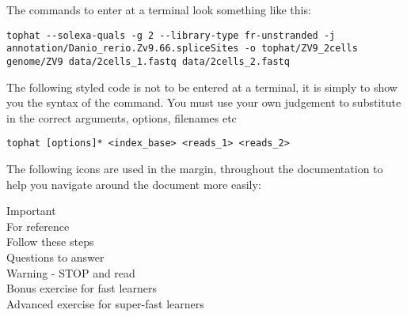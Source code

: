 The commands to enter at a terminal look something like this:
\begin{lstlisting}
tophat --solexa-quals -g 2 --library-type fr-unstranded -j annotation/Danio_rerio.Zv9.66.spliceSites -o tophat/ZV9_2cells genome/ZV9 data/2cells_1.fastq data/2cells_2.fastq
\end{lstlisting}

The following styled code is not to be entered at a terminal, it is simply to show you the syntax of
the command. You must use your own judgement to substitute in the correct arguments, options,
filenames etc

\begin{lstlisting}[style=command_syntax]
tophat [options]* <index_base> <reads_1> <reads_2>
\end{lstlisting}

The following icons are used in the margin, throughout the documentation to help you navigate around
the document more easily:

\hspace*{.2cm} Important\\
\hspace*{.2cm} For reference\\
\hspace*{.2cm} Follow these steps\\
\hspace*{.2cm} Questions to answer\\
\hspace*{.2cm} Warning - STOP and read\\
\hspace*{.2cm} Bonus exercise for fast learners\\
\hspace*{.2cm} Advanced exercise for super-fast learners\\
